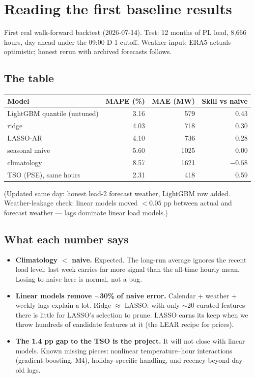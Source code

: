 \section{Reading the first baseline results}

First real walk-forward backtest (2026-07-14). Test: 12 months of PL load,
8{,}666 hours, day-ahead under the 09:00 D-1 cutoff. Weather input: ERA5
actuals --- optimistic; honest rerun with archived forecasts follows.

\subsection{The table}

\begin{center}
\begin{tabular}{lrrr}
\toprule
Model & MAPE (\%) & MAE (MW) & Skill vs naive \\
\midrule
LightGBM quantile (untuned) & 3.16 & 579 & 0.43 \\
ridge          & 4.03 & 718  & 0.30 \\
LASSO-AR       & 4.10 & 736  & 0.28 \\
seasonal naive & 5.60 & 1025 & 0.00 \\
climatology    & 8.57 & 1621 & $-0.58$ \\
\midrule
TSO (PSE), same hours & 2.31 & 418 & 0.59 \\
\bottomrule
\end{tabular}
\end{center}

(Updated same day: honest lead-2 forecast weather, LightGBM row added.
Weather-leakage check: linear models moved $<0.05$ pp between actual and
forecast weather --- lags dominate linear load models.)

\subsection{What each number says}

\begin{itemize}
  \item \textbf{Climatology $<$ naive.} Expected. The long-run average ignores
        the recent load level; last week carries far more signal than the
        all-time hourly mean. Losing to naive here is normal, not a bug.
  \item \textbf{Linear models remove $\sim$30\% of naive error.} Calendar +
        weather + weekly lags explain a lot. Ridge $\approx$ LASSO: with only
        $\sim$20 curated features there is little for LASSO's selection to prune.
        LASSO earns its keep when we throw hundreds of candidate features at it
        (the LEAR recipe for prices).
  \item \textbf{The 1.4 pp gap to the TSO is the project.} It will not close
        with linear models. Known missing pieces: nonlinear
        temperature--hour interactions (gradient boosting, M4), holiday-specific
        handling, and recency beyond day-old lags.
\end{itemize}

